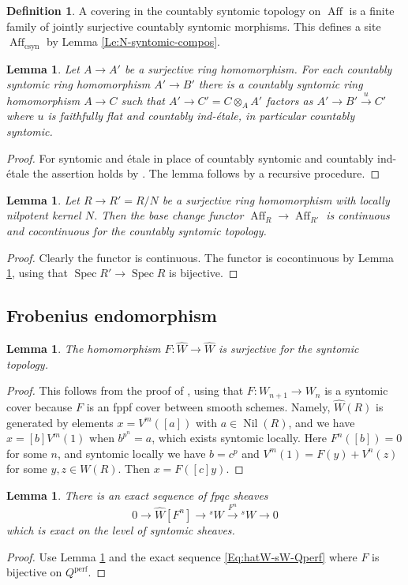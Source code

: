 \documentclass[a4paper,11pt]{amsart}
\theoremstyle{plain}
\newtheorem{Lemma}[equation]{Lemma}
\theoremstyle{definition}
\newtheorem{Defn}[equation]{Definition}
\theoremstyle{remark}
\newcommand{\bLe}{\begin{Lemma}}
\newcommand{\eLe}{\end{Lemma}}
\newcommand{\bDe}{\begin{Defn}}
\newcommand{\eDe}{\end{Defn}}
\newcommand{\bproof}{\begin{proof}}
\newcommand{\eproof}{\end{proof}}
\newcommand{\beqn}{\begin{equation}}
\newcommand{\eeqn}{\end{equation}}
\numberwithin{equation}{section}
\DeclareMathOperator{\csyn}{csyn}
\DeclareMathOperator{\perf}{perf}
\DeclareMathOperator{\Aff}{Aff}
\DeclareMathOperator{\Nil}{Nil}
\DeclareMathOperator{\Spec}{Spec}
\newcommand{\limperf}{^{\perf}}
\newcommand{\sW}{{}^sW}
\begin{document}
\bDe
\label{De:N-syntomic-topology}
A covering in the countably syntomic topology on $\Aff$ is a finite family of jointly surjective countably syntomic morphisms. This defines a site $\Aff_{\csyn}$ by Lemma \ref{Le:N-syntomic-compos}.
\eDe

\bLe
\label{Le:N-syntomic-extend}
Let $A\to A'$ be a surjective ring homomorphism. For each countably syntomic ring homomorphism $A'\to B'$ there is a countably syntomic ring homomorphism $A\to C$ such that $A'\to C'=C\otimes_AA'$ factors as $A'\to B'\xrightarrow u C'$ where $u$ is faithfully flat and countably ind-\'etale, in particular countably syntomic.
\eLe

\bproof
For syntomic and \'etale in place of countably syntomic and countably ind-\'etale the assertion holds by \cite[\href{https://stacks.math.columbia.edu/tag/00T0}{Lemma 00T0}]{Stacks}. The lemma follows by a recursive procedure.
\eproof

\bLe
\label{Le:N-syntomic-cocont}
Let $R\to R'=R/N$ be a surjective ring homomorphism with locally nilpotent kernel $N$. Then the base change functor $\Aff_R\to\Aff_{R'}$ is continuous and cocontinuous for the countably syntomic topology.
\eLe

\bproof
Clearly the functor is continuous. The functor is cocontinuous by Lemma \ref{Le:N-syntomic-extend}, using that $\Spec R'\to\Spec R$ is bijective.
\eproof

\subsection{Frobenius endomorphism}

\bLe
\label{Le:F-on-hatW}
The homomorphism $F\colon \hat W\to\hat W$ is surjective for the syntomic topology.
\eLe

\bproof
This follows from the proof of \cite[Proposition 2.29]{BMVZ}, using that $F\colon W_{n+1}\to W_n$ is a syntomic cover because $F$ is an fppf cover between smooth schemes. 
Namely, $\hat W(R)$ is generated by elements $x=V^m([a])$ with $a\in\Nil(R)$, and we have $x=[b]V^m(1)$ when $b^{p^n}=a$, which exists syntomic locally. Here $F^n([b])=0$ for some $n$, and syntomic locally we have $b=c^p$ and $V^m(1)=F(y)+V^n(z)$ for some $y,z\in W(R)$. Then $x=F([c]y)$.
\eproof

\bLe
\label{Le:hatWFm-sW-sW}
There is an exact sequence of fpqc sheaves
\beqn
0\to\hat W[F^n]\to\sW\xrightarrow{F^n}\sW\to 0
\eeqn
which is exact on the level of syntomic sheaves.
\eLe

\bproof
Use Lemma \ref{Le:F-on-hatW} and the exact sequence \eqref{Eq:hatW-sW-Qperf} where $F$ is bijective on $Q\limperf$.
\eproof
\end{document}
